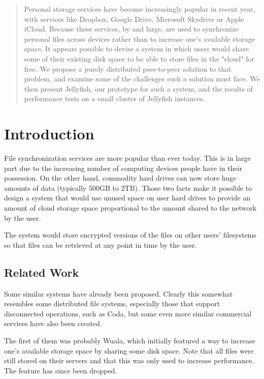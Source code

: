 \documentclass[11pt]{IEEEtran}
\begin{document}
\maketitle
\begin{abstract}
Personal storage services have become increasingly popular in recent year, with services like Dropbox, Google Drive, Microsoft Skydrive or Apple iCloud\cite{dropbox, drive, skydrive, icloud}. Because these services, by and large, are used to synchronize personal files across devices rather than to increase one's available storage space, It appears possible to devise a system in which users would share some of their existing disk space to be able to store files in the "cloud" for free. We propose a purely distributed peer-to-peer solution to that problem, and examine some of the challenges such a solution must face. We then present Jellyfish, our prototype for such a system, and the results of performance tests on a small cluster of Jellyfish instances.
\end{abstract}

\section{Introduction}

File synchronization services are more popular than ever today. This is in large part due to the increasing number of computing devices people have in their possession. On the other hand, commodity hard drives can now store huge amounts of data (typically 500GB to 2TB). Those two facts make it possible to design a system that would use unused space on user hard drives to provide an amount of cloud storage space proportional to the amount shared to the network by the user. 

The system would store encrypted versions of the files on other users' filesystems so that files can be retrieved at any point in time by the user.

\subsection{Related Work}

Some similar systems have already been proposed. Clearly this somewhat resembles some distributed file systems, especially those that support disconnected operations, such as Coda\cite{coda}, but some even more similar commercial services have also been created.

The first of them was probably Wuala\cite{wuala:measurement}, which initially featured a way to increase one's available storage space by sharing some disk space. Note that all files were still stored on their servers and that this was only used to increase performance. The feature has since been dropped.
\end{document}
